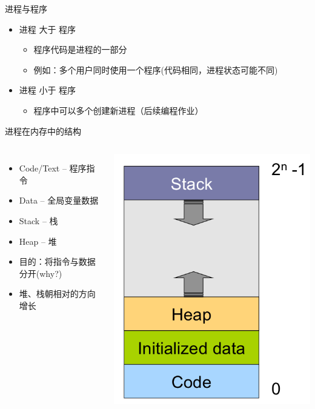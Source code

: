 \documentclass[xcolor=svgnames]{beamer}
\begin{document}
\begin{CJK*}{UTF8}{gbsn}
\begin{frame}{进程与程序}
\begin{itemize}
\item 进程  大于 程序
\begin{itemize}
\item 程序代码是进程的一部分
\item 例如：多个用户同时使用一个程序(代码相同，进程状态可能不同)
\end{itemize} 
\item 进程  小于 程序
\begin{itemize}
\item 程序中可以多个创建新进程（后续编程作业）
\end{itemize} 
\end{itemize} 
\end{frame}

\begin{frame}{进程在内存中的结构}
\begin{columns}%
\begin{itemize}
\item Code/Text -- 程序指令
\item Data -- 全局变量数据
\item Stack -- 栈
\item Heap -- 堆
\item 目的：将指令与数据分开(why?)
\item 堆、栈朝相对的方向增长
\end{itemize}
\includegraphics[width=1.0\textwidth]{memory.png}
\end{columns}%
\end{frame}


\end{CJK*}
\end{document}
